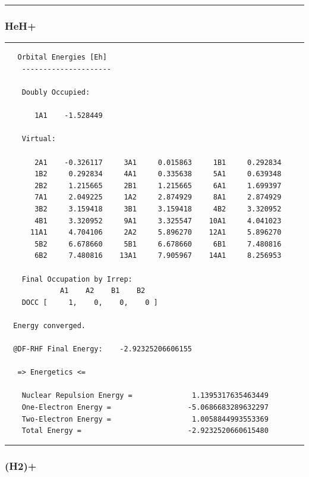 \documentclass[portuguese,]{article}
\begin{document}
\begin{center}\rule{0.5\linewidth}{\linethickness}\end{center}

\hypertarget{heh-2}{%
\subsubsection{HeH+}\label{heh-2}}

\begin{center}\rule{0.5\linewidth}{\linethickness}\end{center}

\begin{verbatim}
   Orbital Energies [Eh]
    ---------------------

    Doubly Occupied:

       1A1    -1.528449

    Virtual:

       2A1    -0.326117     3A1     0.015863     1B1     0.292834
       1B2     0.292834     4A1     0.335638     5A1     0.639348
       2B2     1.215665     2B1     1.215665     6A1     1.699397
       7A1     2.049225     1A2     2.874929     8A1     2.874929
       3B2     3.159418     3B1     3.159418     4B2     3.320952
       4B1     3.320952     9A1     3.325547    10A1     4.041023
      11A1     4.704106     2A2     5.896270    12A1     5.896270
       5B2     6.678660     5B1     6.678660     6B1     7.480816
       6B2     7.480816    13A1     7.905967    14A1     8.256953

    Final Occupation by Irrep:
             A1    A2    B1    B2
    DOCC [     1,    0,    0,    0 ]

  Energy converged.

  @DF-RHF Final Energy:    -2.92325206606155

   => Energetics <=

    Nuclear Repulsion Energy =              1.1395317635463449
    One-Electron Energy =                  -5.0686683289632297
    Two-Electron Energy =                   1.0058844993553369
    Total Energy =                         -2.9232520660615480
\end{verbatim}

\begin{center}\rule{0.5\linewidth}{\linethickness}\end{center}

\hypertarget{h2-5}{%
\subsubsection{(H2)+}\label{h2-5}}
\end{document}
